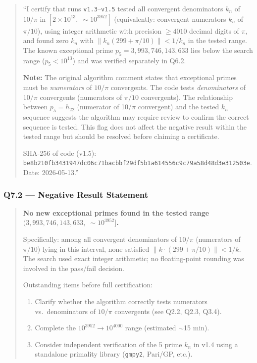 \documentclass[11pt,a4paper]{article}
\begin{document}
\begin{quote}
``I certify that runs \texttt{v1.3}--\texttt{v1.5} tested all convergent
denominators $k_n$ of $10/\pi$ in $[2\times 10^{13},\;\sim\!10^{3952}]$
(equivalently: convergent numerators $k_n$ of $\pi/10$), using integer
arithmetic with precision $\geq 4010$ decimal digits of $\pi$, and found
zero $k_n$ with $\|k_n(299+\pi/10)\| < 1/k_n$ in the tested range.
The known exceptional prime $p_5 = 3{,}993{,}746{,}143{,}633$ lies below
the search range ($p_5 < 10^{13}$) and was verified separately in Q6.2.

\textbf{Note:} The original algorithm comment states that exceptional primes
must be \emph{numerators} of $10/\pi$ convergents. The code tests
\emph{denominators} of $10/\pi$ convergents (numerators of $\pi/10$
convergents). The relationship between $p_5 = h_{22}$ (numerator of
10/$\pi$ convergent) and the tested $k_n$ sequence suggests the
algorithm may require review to confirm the correct sequence is tested.
This flag does not affect the negative result within the tested range
but should be resolved before claiming a certificate.

SHA-256 of code (v1.5): \texttt{be8b210fb3431947dc06c71bacbbf29df5b1a614556c9c79a58d48d3e312503e}.
Date: 2026-05-13.''
\end{quote}

\subsubsection*{Q7.2 --- Negative Result Statement}

\begin{quote}
\textbf{No new exceptional primes found in the tested range
$(3{,}993{,}746{,}143{,}633,\;\sim\!10^{3952}]$.}

Specifically: among all convergent denominators of $10/\pi$ (numerators
of $\pi/10$) lying in this interval, none satisfied $\|k \cdot (299 +
\pi/10)\| < 1/k$. The search used exact integer arithmetic; no
floating-point rounding was involved in the pass/fail decision.

Outstanding items before full certification:
\begin{enumerate}
  \item Clarify whether the algorithm correctly tests numerators vs.\
    denominators of $10/\pi$ convergents (see Q2.2, Q2.3, Q3.4).
  \item Complete the $10^{3952}\to 10^{4000}$ range (estimated $\sim$15 min).
  \item Consider independent verification of the 5 prime $k_n$ in v1.4
    using a standalone primality library (\texttt{gmpy2}, Pari/GP, etc.).
\end{enumerate}
\end{quote}
\end{document}
